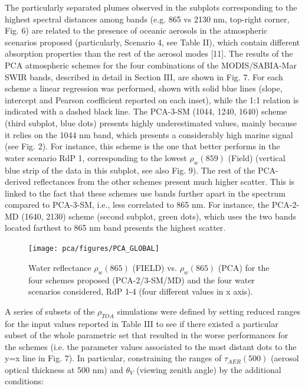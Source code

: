 The particularly separated plumes observed in the subplots corresponding to the highest spectral distances among bands (e.g. 865 vs 2130 nm, top-right corner, Fig. 6) are related to the presence of oceanic aerosols in the atmospheric scenarios proposed (particularly, Scenario 4, see Table II), which contain different absorption properties than the rest of the aerosol modes [11].
The results of the PCA atmospheric schemes for the four combinations of the MODIS/SABIA-Mar SWIR bands, described in detail in Section III, are shown in Fig. 7. For each scheme a linear regression was performed, shown with solid blue lines (slope, intercept and Pearson coefficient reported on each inset), while the 1:1 relation is indicated with a dashed black line. The PCA-3-SM (1044, 1240, 1640) scheme (third subplot, blue dots) presents highly underestimated values, mainly because it relies on the 1044 nm band, which presents a considerably high marine signal (see Fig. 2). For instance, this scheme is the one that better performs in the water scenario RdP 1, corresponding to the lowest $\rho_{w}(859)$ (Field) (vertical blue strip of the data in this subplot, see also Fig. 9). The rest of the PCA-derived reflectances from the other schemes present much higher scatter. This is linked to the fact that these schemes use bands further apart in the spectrum compared to PCA-3-SM, i.e., less correlated to 865 nm. For instance, the PCA-2-MD (1640, 2130) scheme (second subplot, green dots), which uses the two bands located farthest to 865 nm band presents the highest scatter.

\begin{figure}
\centering
\texttt{[image: pca/figures/PCA\_GLOBAL]}
\caption{Water reflectance $\rho_{w}(865)$ (FIELD) vs. $\rho_{w}(865)$ (PCA) for the four schemes proposed (PCA-2/3-SM/MD) and the four water scenarios considered, RdP 1-4 (four different values in x axis).}
\label{pca:pca_global}
\end{figure}

A series of subsets of the $\rho_{TOA}$ simulations were defined by setting reduced ranges for the input values reported in Table III to see if there existed a particular subset of the whole parametric set that resulted in the worse performances for the schemes (i.e. the parameter values associated to the most distant dots to the y=x line in Fig. 7). In particular, constraining the ranges of $\tau_{AER}(500)$ (aerosol optical thickness at 500 nm) and $\theta_{V}$ (viewing zenith angle) by the additional conditions:

